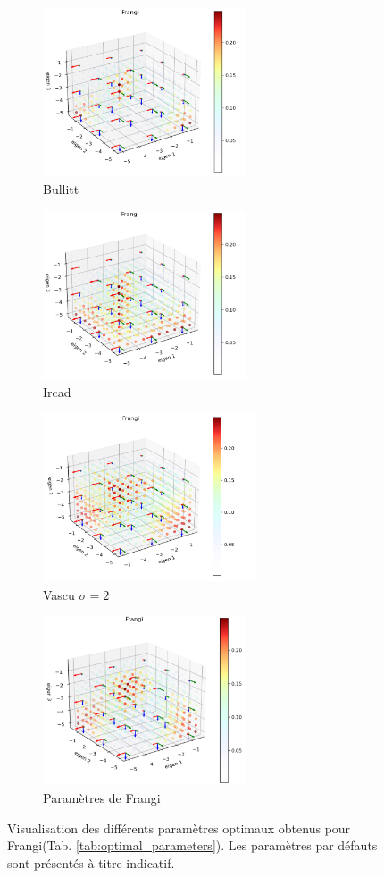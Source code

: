 \begin{figure}[H]

  \begin{subfigure}[t]{0.45\textwidth}
    \includegraphics[height=5cm]{Images/Bullitt_Frangi_BP.png}
    \caption{Bullitt}
  \end{subfigure}
  \begin{subfigure}[t]{0.45\textwidth}
    \includegraphics[height=5cm]{Images/Ircad_Frangi_BP.png}
    \caption{Ircad}
  \end{subfigure}
  \begin{subfigure}[t]{0.45\textwidth}
    \includegraphics[height=5cm]{Images/Vascu_2_Frangi_BP.png}
    \caption{Vascu $\sigma=2$}
  \end{subfigure}
  \begin{subfigure}[t]{0.45\textwidth}
    \includegraphics[height=5cm]{Images/Frangi_default_P.png}
    \caption{Paramètres de Frangi}
  \end{subfigure}
  \label{fig:exemple_geometry_frangi}
  \caption{Visualisation des différents paramètres optimaux obtenus pour Frangi(Tab. \ref{tab:optimal_parameters}). Les paramètres par défauts sont présentés à titre indicatif.}
\end{figure}


